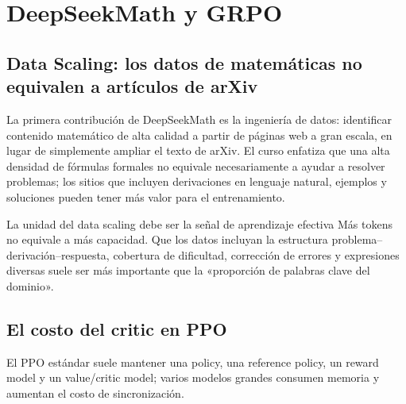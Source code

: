 \section{DeepSeekMath y GRPO}

\subsection{Data Scaling: los datos de matemáticas no equivalen a artículos de arXiv}

La primera contribución de DeepSeekMath es la ingeniería de datos: identificar contenido matemático de alta calidad a partir de páginas web a gran escala, en lugar de simplemente ampliar el texto de arXiv. El curso enfatiza que una alta densidad de fórmulas formales no equivale necesariamente a ayudar a resolver problemas; los sitios que incluyen derivaciones en lenguaje natural, ejemplos y soluciones pueden tener más valor para el entrenamiento.




\begin{importantbox}{La unidad del data scaling debe ser la señal de aprendizaje efectiva}
Más tokens no equivale a más capacidad. Que los datos incluyan la estructura problema--derivación--respuesta, cobertura de dificultad, corrección de errores y expresiones diversas suele ser más importante que la «proporción de palabras clave del dominio».
\end{importantbox}

\subsection{El costo del critic en PPO}

El PPO estándar suele mantener una policy, una reference policy, un reward model y un value/critic model; varios modelos grandes consumen memoria y aumentan el costo de sincronización.

